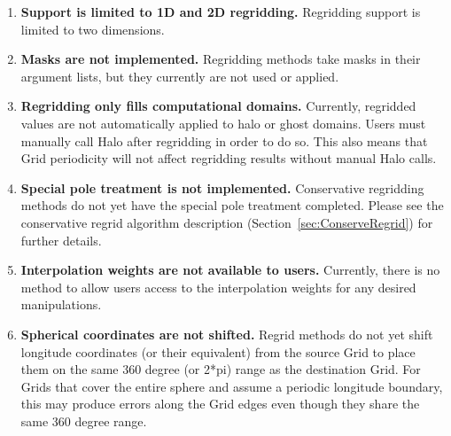 

\begin{enumerate}

\item {\bf Support is limited to 1D and 2D regridding.}  Regridding
support is limited to two dimensions.

\item {\bf Masks are not implemented.}  Regridding methods take
masks in their argument lists, but they currently are not used or
applied.

\item {\bf Regridding only fills computational domains.}  Currently,
regridded values are not automatically applied to halo or ghost
domains.  Users must manually call Halo after regridding in order
to do so.  This also means that Grid periodicity will not affect
regridding results without manual Halo calls.

\item {\bf Special pole treatment is not implemented.}
Conservative regridding methods do not yet have the special pole
treatment completed.  Please see the conservative regrid algorithm
description (Section~\ref{sec:ConserveRegrid}) for further details.

\item {\bf Interpolation weights are not available to users.}  
Currently, there is no method to allow users access to the interpolation
weights for any desired manipulations.

\item {\bf Spherical coordinates are not shifted.}
Regrid methods do not yet shift longitude coordinates
(or their equivalent) from the source Grid to place them on the same
360 degree (or 2*pi) range as the destination Grid.  For Grids that
cover the entire sphere and assume a periodic longitude boundary,
this may produce errors along the Grid edges even though they share
the same 360 degree range.


\end{enumerate}
